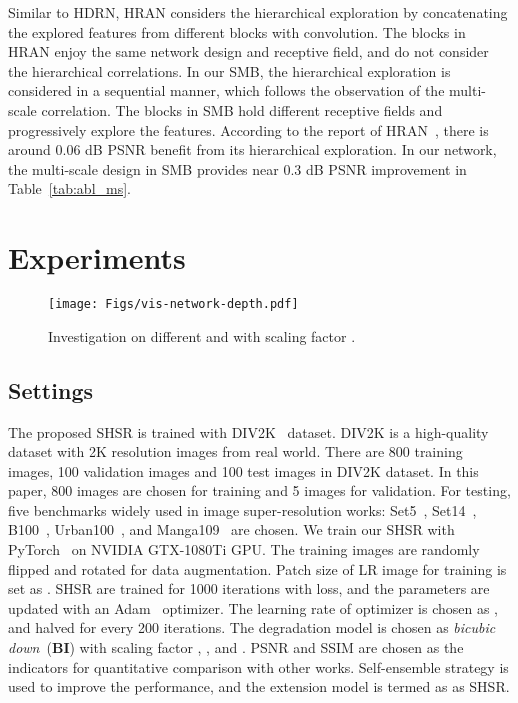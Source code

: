 \documentclass[manuscript,screen]{acmart}
\begin{document}
Similar to HDRN, HRAN considers the hierarchical exploration by concatenating the explored features from different blocks with  convolution. The blocks in HRAN enjoy the same network design and receptive field, and do not consider the hierarchical correlations. In our SMB, the hierarchical exploration is considered in a sequential manner, which follows the observation of the multi-scale correlation. The blocks in SMB hold different receptive fields and progressively explore the features. According to the report of HRAN~\cite{hran}, there is around 0.06 dB PSNR benefit from its hierarchical exploration. In our network, the multi-scale design in SMB provides near 0.3 dB PSNR improvement in Table~\ref{tab:abl_ms}.


\section{Experiments}

\begin{figure}[t]
	\centering
	\texttt{[image: Figs/vis-network-depth.pdf]}
	\caption{Investigation on different  and  with scaling factor .}
	\label{fig:vis-network-depth}
\end{figure}

\subsection{Settings}
The proposed SHSR is trained with DIV2K~\cite{div2k} dataset. DIV2K is a high-quality dataset with 2K resolution images from real world. There are 800 training images, 100 validation images and 100 test images in DIV2K dataset. In this paper, 800 images are chosen for training and 5 images for validation. For testing, five benchmarks widely used in image super-resolution works: Set5~\cite{set5}, Set14~\cite{set14}, B100~\cite{b100}, Urban100~\cite{urban100}, and Manga109~\cite{manga109} are chosen. We train our SHSR with PyTorch~\cite{pytorch} on NVIDIA GTX-1080Ti GPU. The training images are randomly flipped and rotated for data augmentation. Patch size of LR image for training is set as . SHSR are trained for 1000 iterations with  loss, and the parameters are updated with an Adam~\cite{adam} optimizer. The learning rate of optimizer is chosen as , and halved for every 200 iterations. The degradation model is chosen as \textit{bicubic down}~(\textbf{BI}) with scaling factor , , and . PSNR and SSIM are chosen as the indicators for quantitative comparison with other works. Self-ensemble strategy is used to improve the performance, and the extension model is termed as as SHSR.
\end{document}
